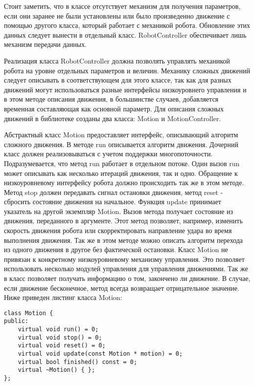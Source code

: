 Стоит заметить, что в классе отсутствует механизм для получения параметров, если они заранее не были установлены или было произведенно движение с помощью другого класса, который работает с механикой робота. Обновление этих данных следует вынести в отдельный класс. RobotController обеспечивает лишь механизм передачи данных.

Реализация класса RobotController должна позволять управлять механикой робота на уровне отдельных параметров и величин. Механику сложных движений следует описывать в соответствующем для этого классе, так как для разных движений могут использоваться разные интерфейсы низкоуровнего управления и в этом методе описания движения, в большинстве случаев, добавляется временная составляющая как основной параметр. Для описания сложных движений в библиотеке созданы два класса: Motion и MotionController.

Абстрактный класс Motion предоставляет интерфейс, описывающий алгоритм сложного движения. В методе run описывается алгоритм движения. Дочерний класс должен реализовываться с учетом поддержки многопоточности. Подразумевается, что метод run работает в отдельном потоке. Один вызов run может описывать как несколько итераций движения, так и одно. Обращение к низкоуровневому интерфейсу робота должно происходить так же в этом методе. Метод stop должен передавать сигнал остановки движения, метод reset - сбросить состояние движения на начальное. Функция update принимает указатель на другой экземпляр Motion. Вызов метода получает состояние из движения, переданного в аргументе. Этот метод позволяет, например, изменить скорость движения робота или скорректировать направление удара во время выполнения движения. Так же в этом методе можно описать алгоритм перехода из одного движения в другое без фактической остановки. Класс Motion не привязан к конкретному низкоуровневому механизму управления. Это позволяет использовать несколько модулей управления для управления движениями. Так же в класс позволяет получать информацию о том, закончено ли движение. В случае, если движение бесконечное, метод всегда возвращает отрицательное значение. Ниже приведен листинг класса Motion:

\lstset{language=C++}
\begin{lstlisting}
class Motion {
public:
    virtual void run() = 0;
    virtual void stop() = 0;
    virtual void reset() = 0;
    virtual void update(const Motion * motion) = 0;
    virtual bool finished() const = 0;
    virtual ~Motion() { };
};
\end{lstlisting}

